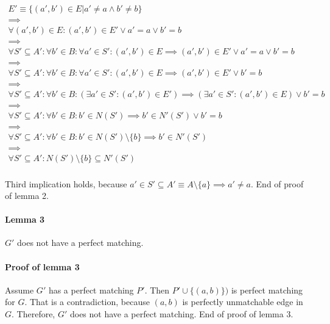 \begin{gather*}
    E' \equiv \{(a', b') \in E | a' \neq a \land b' \neq b\} \\
    \implies \\
    \forall (a', b') \in E: (a', b') \in E' \lor a' = a \lor b' = b \\
    \implies \\
    \forall S' \subseteq A': \forall b' \in B: \forall a' \in S': (a', b') \in E \implies (a', b') \in E' \lor a' = a \lor b' = b \\
    \implies \\
    \forall S' \subseteq A': \forall b' \in B: \forall a' \in S': (a', b') \in E \implies (a', b') \in E' \lor b' = b \\
    \implies \\
    \forall S' \subseteq A': \forall b' \in B: (\exists a' \in S': (a', b') \in E') \implies (\exists a' \in S': (a', b') \in E) \lor b' = b \\
    \implies \\
    \forall S' \subseteq A': \forall b' \in B: b' \in N(S') \implies b' \in N'(S') \lor b' = b \\
    \implies \\
    \forall S' \subseteq A': \forall b' \in B: b' \in N(S') \setminus \{b\} \implies b' \in N'(S') \\
    \implies \\
    \forall S' \subseteq A': N(S') \setminus \{b\} \subseteq N'(S') \\
\end{gather*}

Third implication holds, because $a' \in S' \subseteq A' \equiv A \setminus \{a\} \implies a' \neq a$. \newline
End of proof of lemma 2.

\paragraph{Lemma 3}
$G'$ does not have a perfect matching.

\paragraph{Proof of lemma 3}
Assume $G'$ has a perfect matching $P'$.
Then $P' \cup \{(a, b)\})$ is perfect matching for $G$.
That is a contradiction, because $(a, b)$ is perfectly unmatchable edge in $G$.
Therefore, $G'$ does not have a perfect matching. \newline
End of proof of lemma 3.

